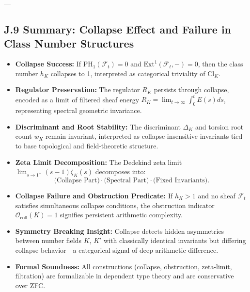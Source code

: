 \documentclass[11pt]{article}
\begin{document}
---

\subsection*{J.9 Summary: Collapse Effect and Failure in Class Number Structures}

\begin{itemize}
  \item \textbf{Collapse Success:}  
  If \( \mathrm{PH}_1(\mathcal{F}_t) = 0 \) and \( \mathrm{Ext}^1(\mathcal{F}_t, -) = 0 \),  
  then the class number \( h_K \) collapses to 1, interpreted as categorical triviality of \( \mathrm{Cl}_K \).
  
  \item \textbf{Regulator Preservation:}  
  The regulator \( R_K \) persists through collapse, encoded as a limit of filtered sheaf energy  
  \( R_K = \lim_{t \to \infty} \int_0^t E(s) ds \), representing spectral geometric invariance.
  
  \item \textbf{Discriminant and Root Stability:}  
  The discriminant \( \Delta_K \) and torsion root count \( w_K \) remain invariant,  
  interpreted as collapse-insensitive invariants tied to base topological and field-theoretic structure.

  \item \textbf{Zeta Limit Decomposition:}  
  The Dedekind zeta limit \( \lim_{s \to 1^+} (s - 1)\zeta_K(s) \) decomposes into:  
  \[
  \text{(Collapse Part)} \cdot \text{(Spectral Part)} \cdot \text{(Fixed Invariants)}.
  \]

  \item \textbf{Collapse Failure and Obstruction Predicate:}  
  If \( h_K > 1 \) and no sheaf \( \mathcal{F}_t \) satisfies simultaneous collapse conditions,  
  the obstruction indicator \( \mathcal{O}_{\mathrm{coll}}(K) = 1 \) signifies persistent arithmetic complexity.

  \item \textbf{Symmetry Breaking Insight:}  
  Collapse detects hidden asymmetries between number fields \( K \), \( K' \) with classically identical invariants  
  but differing collapse behavior—a categorical signal of deep arithmetic difference.

  \item \textbf{Formal Soundness:}  
  All constructions (collapse, obstruction, zeta-limit, filtration) are formalizable in  
  dependent type theory and are conservative over ZFC.
\end{itemize}
\end{document}
